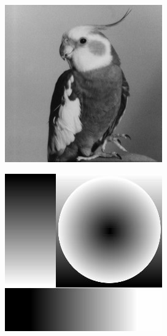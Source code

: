         \begin{figure}[!ht]
            \centering
                \begin{subfigure}[b]{0.17\textwidth}
                    \centering
                    \includegraphics[width=\textwidth]{images/bird.jpg}
                    \caption{}
                    \label{fig:waterloo-bird}
                \end{subfigure}
                \hfill
                \begin{subfigure}[b]{0.17\textwidth}
                    \centering
                    \includegraphics[width=\textwidth]{images/slop.jpg}

\end{subfigure}
\end{figure}
